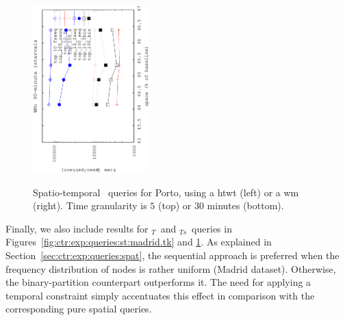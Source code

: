 \begin{figure}[ht]
\begin{center}
			{\includegraphics[angle=-90,width=0.4\textwidth]{figures_synt/porto_st_topk_wm_30.eps}}
			
		\end{center}
		\caption{Spatio-temporal \topK\ queries for Porto, using a \acrshort{htwt} (left) or a \acrshort{wm} (right). 
			Time granularity is $5$ (top) or $30$ minutes (bottom). 
		}
		\label{fig:ctr:exp:queries:st:porto.tk}
	\end{figure}


	Finally, we also include results for \topK$_T$\ and \topK$_{Ts}$\ queries in Figures~\ref{fig:ctr:exp:queries:st:madrid.tk} and \ref{fig:ctr:exp:queries:st:porto.tk}. 
	As explained in Section~\ref{sec:ctr:exp:queries:spat}, the sequential approach is preferred when the frequency distribution of nodes is
	rather uniform (Madrid dataset). Otherwise, the binary-partition counterpart outperforms it. The need for applying a temporal
	constraint simply accentuates this effect in comparison with the corresponding pure spatial queries.
